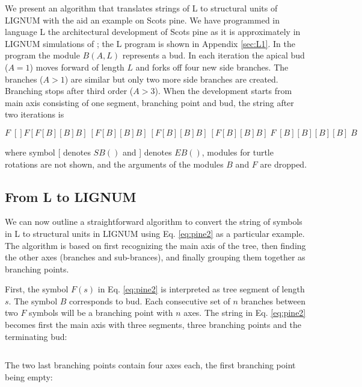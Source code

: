 We present  an algorithm  that translates strings  of L  to structural
units  of LIGNUM  with  the aid  an  example on  Scots  pine. We  have
programmed in  language L the architectural development  of Scots pine
as it  is approximately in LIGNUM  simulations of \citet{perttunen:96,
  perttunen:98}; the L program  is shown in Appendix \ref{sec:L1}.  In
the program  the module $B(A,L)$  represents a bud. In  each iteration
the apical  bud ($A =  1$) moves forward  of length $L$ and  forks off
four new side  branches.  The branches ($A > 1$)  are similar but only
two more side branches are created.  Branching stops after third order
($A > 3$).   When the development starts from  main axis consisting of
one segment, branching point and  bud, the string after two iterations
is

\begin{equation}\label{eq:pine2}
F\;[] F [F[B][B]B]\:[F[B][B]B]\:[F[B][B]B]\:[F[B][B]B]\; F \;[B][B][B][B]\; B
\end{equation}

where symbol [ denotes $SB()$ and ] denotes $EB()$, modules for turtle
rotations are not shown, and the  arguments of the modules $B$ and $F$
are dropped.

\subsection{From L to LIGNUM}\label{sec:LToLignum}

We can now  outline a straightforward algorithm to  convert the string
of symbols in L to structural units in LIGNUM using Eq. \ref{eq:pine2}
as a particular example.  The  algorithm is based on first recognizing
the main axis  of the tree, then finding the  other axes (branches and
sub-brances), and finally grouping them together as branching points.

First, the symbol $F(s)$ in Eq.  \ref{eq:pine2} is interpreted as tree
segment  of length  $s$.  The  symbol  $B$ corresponds  to bud.   Each
consecutive  set of $n$  branches between  two $F$  symbols will  be a
branching  point with  $n$ axes.   The string  in  Eq.  \ref{eq:pine2}
becomes  first the  main  axis with  three  segments, three  branching
points and the terminating bud:

\begin{equation}
[TS, BP, TS, BP, TS, BP, B]
\end{equation}

The  two  last branching  points  contain  four  axes each,  the  first
branching point being empty:

